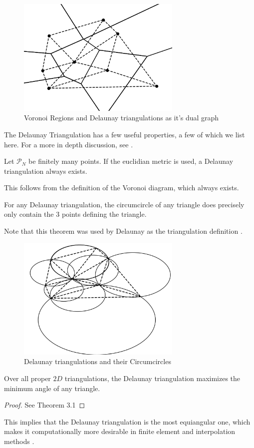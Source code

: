 \begin{figure}[H]
    \centering
    \includegraphics[width=0.7\textwidth]{delaunay.png}
    \caption{Voronoi Regions and Delaunay triangulations as it's dual graph}
    \label{fig:my_label}
\end{figure}
The Delaunay Triangulation has a few useful properties, a few of which we list here. For a more in depth discussion, see \cite{Aurenhammer1991}.
\begin{theorem}
Let $\mathcal{P}_N$ be finitely many points. If the euclidian metric is used, a Delaunay triangulation always exists.
\end{theorem}
This follows from the definition of the Voronoi diagram, which always exists.
\begin{theorem}
For any Delaunay triangulation, the circumcircle of any triangle does precisely only contain the 3 points defining the triangle.
\end{theorem}
Note that this theorem was used by Delaunay as the triangulation definition \cite{Aurenhammer1991}.
\begin{figure}[H]
    \centering
    \includegraphics[width=0.7\textwidth]{circumcircle.png}
    \caption{Delaunay triangulations and their Circumcircles}
    \label{fig:my_label}
\end{figure}
\begin{theorem}[Optimality]
Over all proper $2D$ triangulations, the Delaunay triangulation maximizes the minimum angle of any triangle.
\end{theorem}
\begin{proof}
See \cite{FORTUNE1995} Theorem 3.1
\end{proof}
This implies that the Delaunay triangulation is the most equiangular one, which makes it computationally more desirable in finite element and interpolation methods \cite{Aurenhammer1991} \cite{Rebay1993}.
